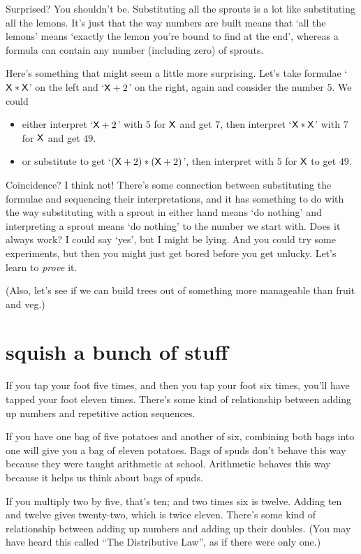 \documentclass{book}
\begin{document}
Surprised? You shouldn't be. Substituting all the sprouts is a lot like substituting all the lemons. It's just that the way numbers are built means that `all the lemons' means `exactly the lemon you're bound to find at the end', whereas a formula can contain any number (including zero) of sprouts.

Here's something that might seem a little more surprising. Let's take formulae `$\mathsf{X}*\mathsf{X}$' on the left and `$\mathsf{X}+2$' on the right, again and consider the number $5$. We could
\begin{itemize}
\item either interpret `$\mathsf{X}+2$' with $5$ for $\mathsf{X}$ and get $7$, then interpret `$\mathsf{X}*\mathsf{X}$' with $7$ for $\mathsf{X}$ and get $49$.
\item or substitute to get `$(\mathsf{X}+2)*(\mathsf{X}+2)$', then interpret with $5$ for $\mathsf{X}$ to get $49$.
\end{itemize}
Coincidence? I think not! There's some connection between substituting the formulae and sequencing their interpretations, and it has something to do with the way substituting with a sprout in either hand means `do nothing' and interpreting a sprout means `do nothing' to the number we start with. Does it always work? I could say `yes', but I might be lying. And you could try some experiments, but then you might just get bored before you get unlucky. Let's learn to \emph{prove} it.

(Also, let's see if we can build trees out of something more manageable than fruit and veg.)


\chapter{squish a bunch of stuff}

If you tap your foot five times, and then you tap your foot six times, you'll have tapped your foot eleven times. There's some kind of relationship between adding up numbers and repetitive action sequences.

If you have one bag of five potatoes and another of six, combining both bags into one will give you a bag of eleven potatoes. Bags of spuds don't behave this way because they were taught arithmetic at school. Arithmetic behaves this way because it helps us think about bags of spuds.

If you multiply two by five, that's ten; and two times six is twelve. Adding ten and twelve gives twenty-two, which is twice eleven. There's some kind of relationship between adding up numbers and adding up their doubles. (You may have heard this called ``The Distributive Law'', as if there were only one.)
\end{document}
